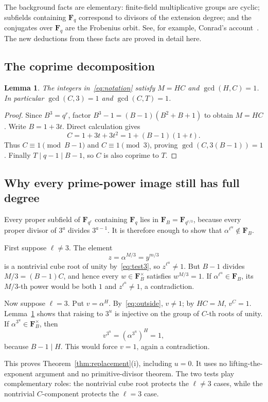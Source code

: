 \documentclass[11pt,a4paper]{article}
\newcommand{\F}{\mathbf F}
\newtheorem{lemma}[theorem]{Lemma}
\theoremstyle{definition}
\theoremstyle{remark}
\begin{document}
The background facts are elementary: finite-field multiplicative groups
are cyclic; subfields containing $\F_q$ correspond to divisors of the
extension degree; and the conjugates over $\F_q$ are the Frobenius orbit.
See, for example, Conrad's account~\cite{conrad}. The new deductions from
these facts are proved in detail here.

\subsection{The coprime decomposition}

\begin{lemma}
\label{lem:coprime}
The integers in~\eqref{eq:notation} satisfy $M=HC$ and
$\gcd(H,C)=1$. In particular $\gcd(C,3)=1$ and $\gcd(C,T)=1$.
\end{lemma}
\begin{proof}
Since $B^3=q^r$, factor $B^3-1=(B-1)(B^2+B+1)$ to obtain $M=HC$.
Write $B=1+3t$. Direct calculation gives
\[
 C=1+3t+3t^2=1+(B-1)(1+t).
\]
Thus $C\equiv1\pmod{B-1}$ and $C\equiv1\pmod3$, proving
$\gcd(C,3(B-1))=1$. Finally $T\mid q-1\mid B-1$, so $C$ is also
coprime to $T$.
\end{proof}

\subsection{Why every prime-power image still has full degree}

Every proper subfield of $\F_{q^r}$ containing $\F_q$ lies in
$\F_B=\F_{q^{r/3}}$, because every proper divisor of $3^a$ divides
$3^{a-1}$. It is therefore enough to show that
$\alpha^{\ell^u}\notin\F_B$.

First suppose $\ell\ne3$. The element
\[
 z=\alpha^{M/3}=y^{m/3}
\]
is a nontrivial cube root of unity by~\eqref{eq:test3}, so
$z^{\ell^u}\ne1$. But $B-1$ divides $M/3=(B-1)C$, and hence every
$w\in\F_B^{\times}$ satisfies $w^{M/3}=1$. If
$\alpha^{\ell^u}\in\F_B$, its $M/3$-th power would be both $1$ and
$z^{\ell^u}\ne1$, a contradiction.

Now suppose $\ell=3$. Put $v=\alpha^H$. By~\eqref{eq:outside}, $v\ne1$;
by $HC=M$, $v^C=1$. Lemma~\ref{lem:coprime} shows that raising to $3^u$
is injective on the group of $C$-th roots of unity. If
$\alpha^{3^u}\in\F_B^{\times}$, then
\[
 v^{3^u}=(\alpha^{3^u})^H=1,
\]
because $B-1\mid H$. This would force $v=1$, again a contradiction.

This proves Theorem~\ref{thm:replacement}(i), including $u=0$. It uses no
lifting-the-exponent argument and no primitive-divisor theorem. The two
tests play complementary roles: the nontrivial cube root protects the
$\ell\ne3$ cases, while the nontrivial $C$-component protects the
$\ell=3$ case.
\end{document}
